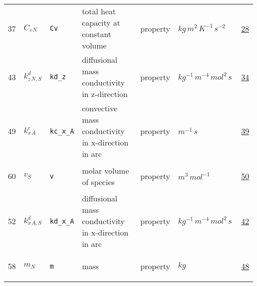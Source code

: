 \begin{longtable}{|p{1cm}|p{2.5cm}|p{4.5cm}|p{8cm}|p{3.0cm}|p{3cm}|p{1cm}|}
                 \\
            37
             & \hypertarget{"v:37"}{ $ {{C_v}}{_{N}} $}
             & \verb|Cv|
             & total heat capacity at constant volume
             & \begin{lay}property \end{lay}
             & $ kg \,m^{2} \,K^{-1} \,s^{-2} \, $
             &                 \hyperlink{"e:28"}{ 28 }
                 \\
            43
             & \hypertarget{"v:43"}{ $ {{k^d_z}}{_{N, S}} $}
             & \verb|kd_z|
             & diffusional mass conductivity in z-direction
             & \begin{lay}property \end{lay}
             & $ kg^{-1} \,m^{-4} \,mol^{2} \,s \, $
             &                 \hyperlink{"e:34"}{ 34 }
                 \\
            49
             & \hypertarget{"v:49"}{ $ {{k^c_x}}{_{A}} $}
             & \verb|kc_x_A|
             &  convective mass conductivity in x-direction in arc
             & \begin{lay}property \end{lay}
             & $ m^{-1} \,s \, $
             &                 \hyperlink{"e:39"}{ 39 }
                 \\
            60
             & \hypertarget{"v:60"}{ $ {v}{_{S}} $}
             & \verb|v|
             & molar volume of species
             & \begin{lay}property \end{lay}
             & $ m^{3} \,mol^{-1} \, $
             &                 \hyperlink{"e:50"}{ 50 }
                 \\
            52
             & \hypertarget{"v:52"}{ $ {{k^d_x}}{_{A, S}} $}
             & \verb|kd_x_A|
             & diffusional mass conductivity in x-direction in arc
             & \begin{lay}property \end{lay}
             & $ kg^{-1} \,m^{-4} \,mol^{2} \,s \, $
             &                 \hyperlink{"e:42"}{ 42 }
                 \\
            58
             & \hypertarget{"v:58"}{ $ {m}{_{N}} $}
             & \verb|m|
             & mass
             & \begin{lay}property \end{lay}
             & $ kg \, $
             &                 \hyperlink{"e:48"}{ 48 }
                 \\

\end{longtable}
